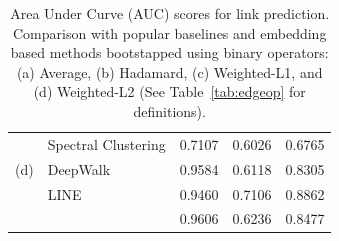 \begin{table}[h]
\begin{tabular}{c|l|l|l|l}
	& Spectral Clustering     & 0.7107 & 0.6026 & 0.6765 \\
	(d) & DeepWalk            & 0.9584 & 0.6118 & 0.8305 \\ %
	& LINE 			  		  & 0.9460 & 0.7106 & 0.8862 \\
	& \nodevec          	  & 0.9606 & 0.6236 & 0.8477  \\ 
	\end{tabular}
	\vspace{-0.2cm}
	\caption{Area Under Curve (AUC) scores for link prediction. Comparison with popular baselines and embedding based methods bootstapped using binary operators: (a) Average, (b) Hadamard, (c) Weighted-L1, and (d) Weighted-L2
	(See Table~\ref{tab:edgeop} for definitions).
	}\label{tab:lp_random}
	\vspace{-0.4cm}
\end{table}

